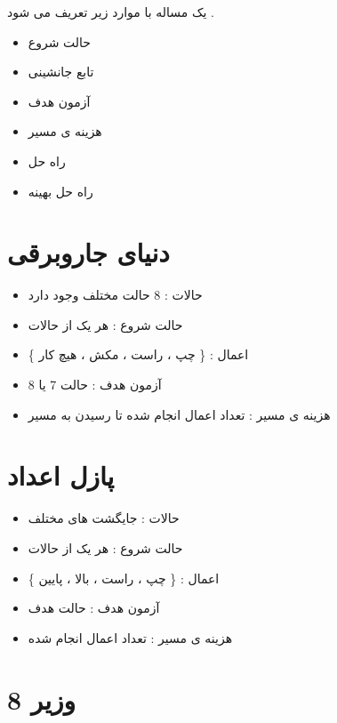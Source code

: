 \documentclass[12pt]{article}
\begin{document}
یک مساله با موارد زیر تعریف می شود .


\begin{itemize}
	\item حالت شروع 
	\item تابع جانشینی
	\item آزمون هدف
	\item هزینه ی مسیر
	\item راه حل
	\item راه حل بهینه
\end{itemize}







\section{دنیای جاروبرقی}



\begin{itemize}
	\item حالات : 8 حالت مختلف وجود دارد 
	\item حالت شروع : هر یک از حالات
	\item اعمال : 
	\{ چپ ، راست ، مکش ، هیچ کار \}
	\item آزمون هدف : حالت 7 یا 8
	\item هزینه ی مسیر : تعداد اعمال انجام شده تا رسیدن به مسیر
\end{itemize}




\section{پازل اعداد}


\begin{itemize}
	\item حالات : جایگشت های مختلف
	\item حالت شروع : هر یک از حالات
	\item اعمال :
	\{ چپ ، راست ، بالا ، پایین \}
	\item آزمون هدف : حالت هدف
	\item هزینه ی مسیر : تعداد اعمال انجام شده
\end{itemize}







\section{8 وزیر}
\end{document}
